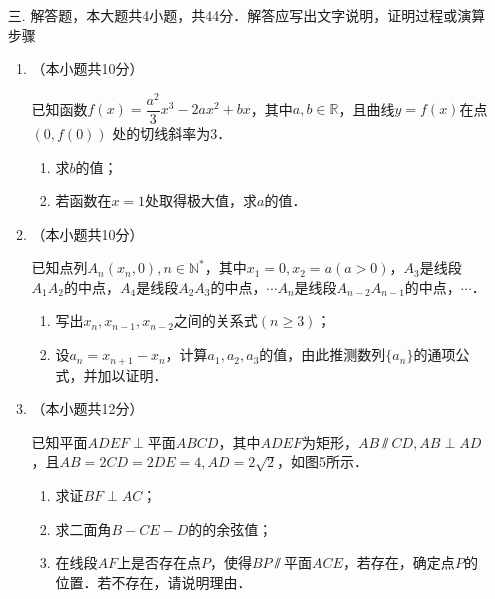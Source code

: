 \documentclass[a4paper]{ctexart}%
\begin{document}
\begin{itemize}
\item[\Heiti 三.]{\Heiti 解答题，本大题共4小题，共44分．解答应写出文字说明，证明过程或演算步骤}
\begin{enumerate}[leftmargin=*]\addtocounter{enumi}{14}

\item （本小题共10分）

已知函数$f(x)=\dfrac {a^2}3 x^3-2ax^2+bx$，其中$a,b\in \mathbb{R}$，且曲线$y=f(x)$在点$(0,f(0))$ 处的切线斜率为3．\begin{enumerate}[align=left,leftmargin=*,labelsep=0pt,label= \hspace{-0.33em} （\Roman*）]
                   \item 求$b$的值；
                   \item 若函数在$x=1$处取得极大值，求$a$的值．
        \end{enumerate}

\vfill

\item （本小题共10分）

已知点列$A_n(x_n,0),n\in \mathbb{N}^*$，其中$x_1=0,x_2=a(a>0)$，$A_3$是线段$A_1A_2$的中点，$A_4$是线段$A_2A_3$的中点，$\cdots A_n$是线段$A_{n-2}A_{n-1}$的中点，$\cdots$．\begin{enumerate}[align=left,leftmargin=*,labelsep=0pt,label= \hspace{-0.33em} （\Roman*）]
                   \item 写出$x_n,x_{n-1},x_{n-2}$之间的关系式$(n\ge 3)$；
                   \item 设$a_n=x_{n+1}-x_n$，计算$a_1,a_2,a_3$的值，由此推测数列$\{a_n\}$的通项公式，并加以证明．
        \end{enumerate}
\vfill
\newpage


\item （本小题共12分）

已知平面$ADEF\perp\text{平面}ABCD$，其中$ADEF$为矩形，$AB\sslash CD,AB\perp AD$，且$AB=2CD=2DE=4,AD=2\sqrt{2}$，如图5所示．\begin{enumerate}[align=left,leftmargin=*,labelsep=0pt,label= \hspace{-0.33em} （\Roman*）]
    \item 求证$BF\perp AC $；
    \item 求二面角$B-CE-D$的的余弦值；
    \item 在线段$AF$上是否存在点$P$，使得$BP\sslash \text{平面}ACE$，若存在，确定点$P$的位置．若不存在，请说明理由．\end{enumerate}


\end{enumerate}
\end{itemize}
\end{document}
